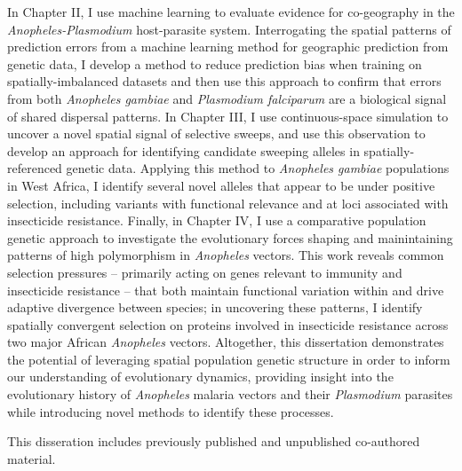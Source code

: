 {In Chapter II, I use machine learning to evaluate evidence for co-geography in the \textit{Anopheles-Plasmodium}
host-parasite system. Interrogating the spatial patterns of prediction errors from a machine learning method 
for geographic prediction from genetic data, I develop a method to reduce prediction bias when training on 
spatially-imbalanced datasets and then use this approach to confirm that errors from both \textit{Anopheles gambiae}
and \textit{Plasmodium falciparum} are a biological signal of shared dispersal patterns.
In Chapter III, I use continuous-space simulation to uncover a novel spatial signal of selective sweeps, and 
use this observation to develop an approach for identifying candidate sweeping alleles in spatially-referenced genetic data.
Applying this method to \textit{Anopheles gambiae} populations in West Africa, I identify several novel alleles
that appear to be under positive selection, including variants with functional relevance and at loci associated with insecticide resistance.
Finally, in Chapter IV, I use a comparative population genetic approach to investigate the evolutionary forces 
shaping and mainintaining patterns of high polymorphism in \textit{Anopheles} vectors. This work reveals
common selection pressures -- primarily acting on genes relevant to immunity and insecticide resistance -- 
that both maintain functional variation within and drive adaptive divergence between species;
in uncovering these patterns, I identify spatially convergent selection on proteins involved in insecticide resistance
across two major African \textit{Anopheles} vectors.
Altogether, this dissertation demonstrates the potential of leveraging spatial population genetic structure in order to 
inform our understanding of evolutionary dynamics, providing insight into the evolutionary history of \textit{Anopheles}
malaria vectors and their \textit{Plasmodium} parasites while introducing novel methods to identify these processes.

This disseration includes previously published and unpublished co-authored material.
}
